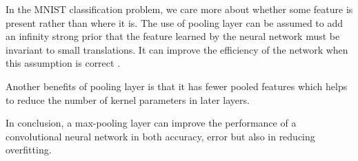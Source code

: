 \documentclass[11pt]{article}
\begin{document}
In the MNIST classification problem, we care more about whether some feature is present rather than where it is. The use of pooling layer can be assumed to add an infinity strong prior that the feature learned by the neural network must be invariant to small translations. It can improve the efficiency of the network when this assumption is correct \cite{Goodfellow-et-al-2016-Book}. 

Another benefits of pooling layer is that it has fewer pooled features which helps to reduce the number of kernel parameters in later layers. 

In conclusion, a max-pooling layer can improve the performance of a convolutional neural network in both accuracy, error but also in reducing overfitting.
\newpage
\printbibliography
\end{document}
